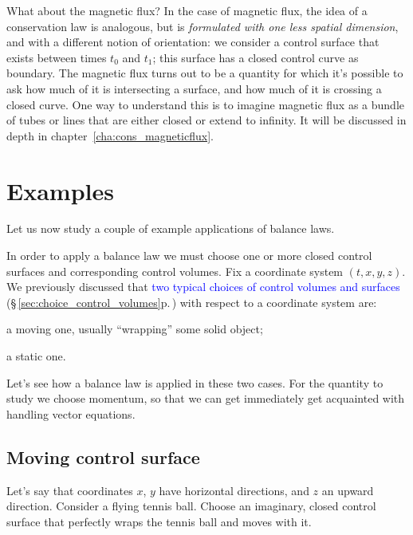 \documentclass[a4paper,12pt,%
onecolumn,oneside,%
british%
]{memoir}
\renewcommand*{\|}[1][]{\nonscript\:#1\vert\nonscript\:\mathopen{}}
\newcommand*{\sect}{\S}%
\newcommand*{\chap}{chapter}%
\renewcommand*{\autoref}[3][\sect\,\ref]{\textcolor{blue}{#3} {\color{blue}\scriptsize(\faIcon[regular]{eye}\;#1{#2}\;p.\,\pageref{#2})}}
\newcommand*{\yti}{t_{0}}
\newcommand*{\ytf}{t_{1}}
\begin{document}
\begin{extra}{What about the magnetic flux?}
  In the case of magnetic flux, the idea of a conservation law is analogous, but is \emph{formulated with one less spatial dimension}, and with a different notion of orientation: we consider a control surface that exists between times $\yti$ and $\ytf$; this surface has a closed control curve as boundary. The magnetic flux turns out to be a quantity for which it's possible to ask how much of it is intersecting a surface, and how much of it is crossing a closed curve. One way to understand this is to imagine magnetic flux as a bundle of tubes or lines that are either closed or extend to infinity. It will be discussed in depth in \chap~\ref{cha:cons_magneticflux}.
\end{extra}


\section{Examples}
\label{sec:example_balance_vect}

Let us now study a couple of example applications of balance laws.

In order to apply a balance law we must choose one or more closed control surfaces and corresponding control volumes. Fix a coordinate system $(t,x,y,z)$. We previously discussed that \autoref{sec:choice_control_volumes}{two typical choices of control volumes and surfaces} with respect to a coordinate system are:
\begin{enumerate*}[label=(\alph*)]
\item a moving one, usually \enquote{wrapping} some solid object;
\item a static one.
\end{enumerate*}
Let's see how a balance law is applied in these two cases. For the quantity to study we choose momentum, so that we can get immediately get acquainted with handling vector equations.

\subsection{Moving control surface}
\label{sec:example_balance_moving}

Let's say that coordinates $x$, $y$ have horizontal directions, and $z$ an upward direction. Consider a flying tennis ball. Choose an imaginary, closed control surface that perfectly wraps the tennis ball and moves with it.
\end{document}
